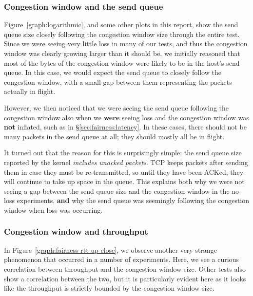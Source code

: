 \subsubsection{Congestion window and the send queue}
\label{sec:closing:sendq}
Figure~\ref{graph:logarithmic}, and some other plots in this report, show the
send queue size closely following the congestion window size through the entire test.
Since we were seeing very little loss in many of our tests, and thus the
congestion window was clearly growing larger than it should be, we initially
reasoned that most of the bytes of the congestion window were likely to be in
the host's send queue. In this case, we would expect the send queue to closely
follow the congestion window, with a small gap between them representing the
packets actually in flight.

However, we then noticed that we were seeing the send queue following the
congestion window also when we \textbf{were} seeing loss and the congestion
window was \textbf{not} inflated, such as in \S\ref{sec:fairness:latency}.
In these cases, there should not be many
packets in the send queue at all; they should mostly all be in flight.

It turned out that the reason for this is surprisingly simple; the send queue
size reported by the kernel \emph{includes unacked packets}. TCP keeps packets
after sending them in case they must be re-transmitted, so until they have been
ACKed, they will continue to take up space in the queue. This explains both why
we were not seeing a gap between the send queue size and the congestion window
in the no-loss experiments, \textbf{and} why the send queue was seemingly
following the congestion window when loss was occurring.

\subsubsection{Congestion window and throughput}

In Figure~\ref{graph:fairness-rtt-up-close}, we observe another very strange
phenomenon that occurred in a number of experiments. Here, we see a curious
correlation between throughput and the congestion window size. Other tests also
show a correlation between the two, but it is particularly evident here as it 
looks like the throughput is strictly bounded by the congestion window size.

